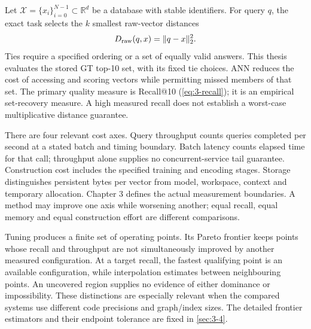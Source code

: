 Let $\mathcal X=\{x_i\}_{i=0}^{N-1}\subset\mathbb R^d$ be a database
with stable identifiers. For query $q$, the exact task selects the $k$
smallest raw-vector distances
\begin{equation}
 D_{\mathrm{raw}}(q,x)=\|q-x\|_2^2.
 \label{eq:2-raw}
\end{equation}
Ties require a specified ordering or a set of equally valid answers.
This thesis evaluates the stored GT top-10 set, with its fixed tie choices.
ANN reduces the cost of accessing and scoring vectors while permitting
missed members of that set. The primary quality measure is Recall@10
(\cref{eq:3-recall}); it is an empirical set-recovery measure. A high measured
recall does not establish a worst-case multiplicative distance guarantee.

There are four relevant cost axes. Query throughput counts queries completed
per second at a stated batch and timing boundary. Batch latency counts
elapsed time for that call; throughput alone supplies no concurrent-service
tail guarantee. Construction cost includes the specified training and
encoding stages. Storage distinguishes persistent bytes per vector from
model, workspace, context and temporary allocation. Chapter 3 defines the
actual measurement boundaries. A method may improve one axis while worsening
another; equal recall, equal memory and equal construction effort are
different comparisons.

Tuning produces a finite set of operating points. Its Pareto frontier keeps
points whose recall and throughput are not simultaneously improved by
another measured configuration. At a target recall, the fastest qualifying
point is an available configuration, while interpolation estimates between
neighbouring points. An uncovered region supplies no evidence of either
dominance or impossibility. These distinctions are especially relevant when
the compared systems use different code precisions and graph/index sizes.
The detailed frontier estimators and their endpoint tolerance are fixed in
\cref{sec:3-4}.
